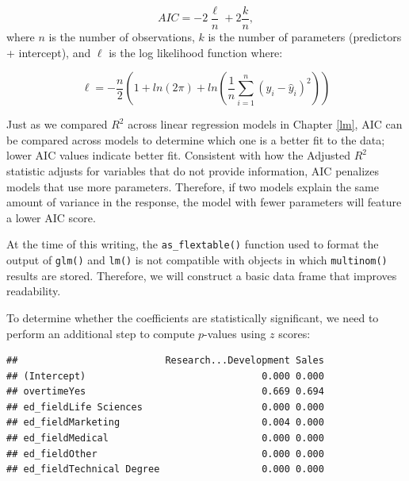 \documentclass[
]{book}
\newenvironment{Shaded}{\begin{snugshade}}{\end{snugshade}}
\newcommand{\CommentTok}[1]{\textcolor[rgb]{0.56,0.35,0.01}{\textit{#1}}}
\newcommand{\DecValTok}[1]{\textcolor[rgb]{0.00,0.00,0.81}{#1}}
\newcommand{\FunctionTok}[1]{\textcolor[rgb]{0.00,0.00,0.00}{#1}}
\newcommand{\NormalTok}[1]{#1}
\newcommand{\OtherTok}[1]{\textcolor[rgb]{0.56,0.35,0.01}{#1}}
\newcommand{\SpecialCharTok}[1]{\textcolor[rgb]{0.00,0.00,0.00}{#1}}
\begin{document}
\[ AIC = -2\frac{\ell}{n} + 2\frac{k}{n}, \]
where \(n\) is the number of observations, \(k\) is the number of parameters (predictors + intercept), and \(\ell\) is the log likelihood function where:

\[ \ell = -\frac{n}{2}(1 + ln(2\pi) + ln(\frac{1}{n} \displaystyle\sum_{i=1}^{n}(y_i - \hat{y}_i)^2))  \]

Just as we compared \(R^2\) across linear regression models in Chapter \ref{lm}, AIC can be compared across models to determine which one is a better fit to the data; lower AIC values indicate better fit. Consistent with how the Adjusted \(R^2\) statistic adjusts for variables that do not provide information, AIC penalizes models that use more parameters. Therefore, if two models explain the same amount of variance in the response, the model with fewer parameters will feature a lower AIC score.

At the time of this writing, the \texttt{as\_flextable()} function used to format the output of \texttt{glm()} and \texttt{lm()} is not compatible with objects in which \texttt{multinom()} results are stored. Therefore, we will construct a basic data frame that improves readability.

To determine whether the coefficients are statistically significant, we need to perform an additional step to compute \(p\)-values using \(z\) scores:

\begin{Shaded}
\end{Shaded}

\begin{verbatim}
##                          Research...Development Sales
## (Intercept)                               0.000 0.000
## overtimeYes                               0.669 0.694
## ed_fieldLife Sciences                     0.000 0.000
## ed_fieldMarketing                         0.004 0.000
## ed_fieldMedical                           0.000 0.000
## ed_fieldOther                             0.000 0.000
## ed_fieldTechnical Degree                  0.000 0.000
\end{verbatim}
\end{document}
